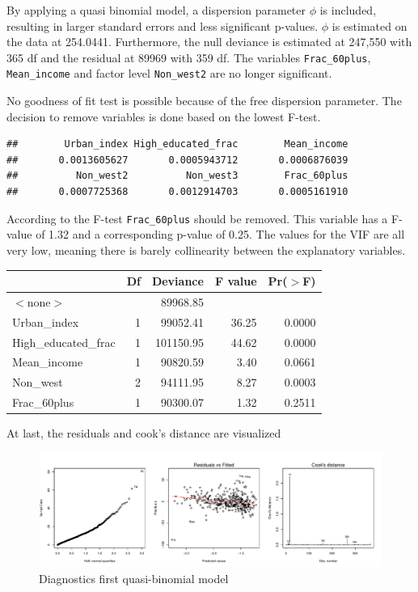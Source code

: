 \documentclass[11pt,]{article}
\begin{document}
By applying a quasi binomial model, a dispersion parameter \(\phi\) is
included, resulting in larger standard errors and less significant
p-values. \(\phi\) is estimated on the data at 254.0441. Furthermore,
the null deviance is estimated at 247,550 with 365 df and the residual
at 89969 with 359 df. The variables \texttt{Frac\_60plus},
\texttt{Mean\_income} and factor level \texttt{Non\_west2} are no longer
significant.

No goodness of fit test is possible because of the free dispersion
parameter. The decision to remove variables is done based on the lowest
F-test.

\begin{verbatim}
##        Urban_index High_educated_frac        Mean_income 
##       0.0013605627       0.0005943712       0.0006876039 
##          Non_west2          Non_west3        Frac_60plus 
##       0.0007725368       0.0012914703       0.0005161910
\end{verbatim}

According to the F-test \texttt{Frac\_60plus} should be removed. This
variable has a F-value of 1.32 and a corresponding p-value of 0.25. The
values for the VIF are all very low, meaning there is barely
collinearity between the explanatory variables.

\begin{table}[ht]
\centering
\begin{tabular}{lrrrr}
  \hline
 & Df & Deviance & F value & Pr($>$F) \\ 
  \hline
$<$none$>$ &  & 89968.85 &  &  \\ 
  Urban\_index & 1 & 99052.41 & 36.25 & 0.0000 \\ 
  High\_educated\_frac & 1 & 101150.95 & 44.62 & 0.0000 \\ 
  Mean\_income & 1 & 90820.59 & 3.40 & 0.0661 \\ 
  Non\_west & 2 & 94111.95 & 8.27 & 0.0003 \\ 
  Frac\_60plus & 1 & 90300.07 & 1.32 & 0.2511 \\ 
   \hline
\end{tabular}
\end{table}

At last, the residuals and cook's distance are visualized

\begin{figure}[H]

{\centering \includegraphics{Report_files/figure-latex/unnamed-chunk-15-1} 

}

\caption{\label{ass_mdl2}Diagnostics first quasi-binomial model}\label{fig:unnamed-chunk-15}
\end{figure}
\end{document}
